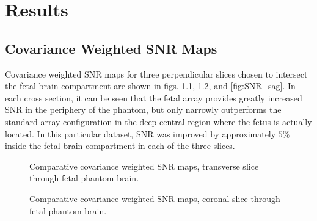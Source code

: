 \chapter{Results}
\section{Covariance Weighted SNR Maps}

Covariance weighted SNR maps for three perpendicular slices chosen to intersect the fetal brain compartment are shown in
figs. \ref{fig:SNR_tra}, \ref{fig:SNR_cor}, and \ref{fig:SNR_sag}. In each cross section, it can be seen that the fetal
array provides greatly increased SNR in the periphery of the phantom, but only narrowly outperforms the standard array
configuration in the deep central region where the fetus is actually located. In this particular dataset, SNR was
improved by approximately $5\%$ inside the fetal brain compartment in each of the three slices. 

\begin{figure}
\caption{Comparative covariance weighted SNR maps, transverse slice through fetal phantom brain.}
\label{fig:SNR_tra}
\end{figure}

\begin{figure}
\caption{Comparative covariance weighted SNR maps, coronal slice through fetal phantom brain.}
\label{fig:SNR_cor}
\end{figure}

